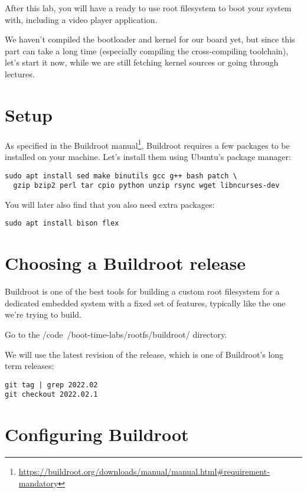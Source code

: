 
After this lab, you will have a ready to use root filesystem to boot
your system with, including a video player application.

We haven't compiled the bootloader and kernel for our board yet,
but since this part can take a long time (especially compiling the
cross-compiling toolchain), let's start it now, while we are still
fetching kernel sources or going through lectures.

\section{Setup}

As specified in the Buildroot
manual\footnote{\url{https://buildroot.org/downloads/manual/manual.html\#requirement-mandatory}},
Buildroot requires a few packages to be installed on your
machine. Let's install them using Ubuntu's package manager:

\begin{verbatim}
sudo apt install sed make binutils gcc g++ bash patch \
  gzip bzip2 perl tar cpio python unzip rsync wget libncurses-dev
\end{verbatim}

You will later also find that you also need extra packages:

\begin{verbatim}
sudo apt install bison flex
\end{verbatim}

\section{Choosing a Buildroot release}

Buildroot is one of the best tools for building a custom root filesystem
for a dedicated embedded system with a fixed set of features, typically
like the one we're trying to build.

Go to the /code{~/boot-time-labs/rootfs/buildroot/} directory.

We will use the latest revision of the  release, which is
one of Buildroot's long term releases:

\begin{verbatim}
git tag | grep 2022.02
git checkout 2022.02.1
\end{verbatim}

\section{Configuring Buildroot}

